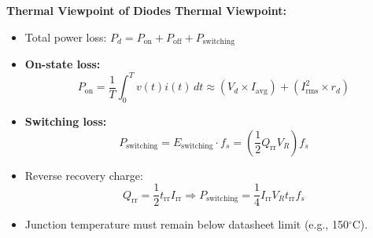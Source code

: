 \begin{frame}{\textbf{Thermal Viewpoint of Diodes}}
    \textbf{Thermal Viewpoint:}
    \begin{itemize}
        \item Total power loss: $P_d = P_{\text{on}} + P_{\text{off}} + P_{\text{switching}}$
        \item \textbf{On-state loss:}
        \begin{equation}
            P_{\text{on}} = \frac{1}{T} \int_0^T v(t)i(t)\, dt \approx (V_d \times I_{\text{avg}}) + (I_{\text{rms}}^2 \times r_d)
        \end{equation}
        \item \textbf{Switching loss:}
        \begin{equation}
            P_{\text{switching}} = E_{\text{switching}} \cdot f_s = \left( \frac{1}{2} Q_{\text{rr}} V_R \right) f_s
        \end{equation}
        \item Reverse recovery charge:
        \begin{equation}
            Q_{\text{rr}} = \frac{1}{2} t_{\text{rr}} I_{\text{rr}} \Rightarrow P_{\text{switching}} = \frac{1}{4} I_{\text{rr}} V_R t_{\text{rr}} f_s
        \end{equation}
        \item Junction temperature must remain below datasheet limit (e.g., 150$^\circ$C).
    \end{itemize}
\end{frame}